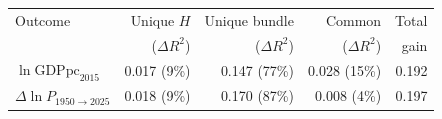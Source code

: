 \begin{tabular}{lrrrr}
\toprule
Outcome & Unique $H$ & Unique bundle & Common & Total \\
 & ($\Delta R^2$) & ($\Delta R^2$) & ($\Delta R^2$) & gain \\
\midrule
$\ln\text{GDPpc}_{2015}$ & 0.017 (9\%) & 0.147 (77\%) & 0.028 (15\%) & 0.192 \\
$\Delta\ln\!P_{1950\to2025}$ & 0.018 (9\%) & 0.170 (87\%) & 0.008 (4\%) & 0.197 \\
\bottomrule
\end{tabular}
